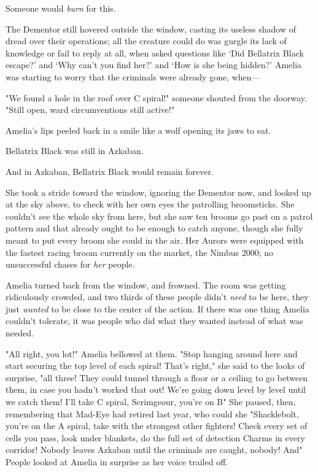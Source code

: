 Someone would \emph{burn} for this.

The Dementor still hovered outside the window, casting its useless shadow of
dread over their operations; all the creature could do was gurgle its lack of
knowledge or fail to reply at all, when asked questions like `Did Bellatrix
Black escape?' and `Why can't you find her?' and `How is she being hidden?'
Amelia was starting to worry that the criminals were already gone, when---

"We found a hole in the roof over C spiral!" someone shouted from the doorway.
"Still open, ward circumventions still active!"

Amelia's lips peeled back in a smile like a wolf opening its jaws to eat.

Bellatrix Black was still in Azkaban.

And in Azkaban, Bellatrix Black would remain forever.

She took a stride toward the window, ignoring the Dementor now, and looked up
at the sky above, to check with her own eyes the patrolling broomsticks. She
couldn't see the whole sky from here, but she saw ten brooms go past on a
patrol pattern and that already ought to be enough to catch anyone, though she
fully meant to put every broom she could in the air. Her Aurors were equipped
with the fastest racing broom currently on the market, the Nimbus 2000; no
unsuccessful chases for \emph{her} people.

Amelia turned back from the window, and frowned. The room was getting
ridiculously crowded, and two thirds of these people didn't \emph{need} to be
here, they just \emph{wanted} to be close to the center of the action. If there
was one thing Amelia couldn't tolerate, it was people who did what they wanted
instead of what was needed.

"All right, you lot!" Amelia bellowed at them. "Stop hanging around here and
start securing the top level of each spiral! That's right," she said to the
looks of surprise, "all three! They could tunnel through a floor or a ceiling
to go between them, in case you hadn't worked that out! We're going down level
by level until we catch them! I'll take C spiral, Scrimgeour, you're on
B{\el}" She paused, then, remembering that Mad-Eye had retired last year,
who could she{\el} "Shacklebolt, you're on the A spiral, take with the
strongest other fighters! Check every set of cells you pass, look under
blankets, do the full set of detection Charms in every corridor! Nobody leaves
Azkaban until the criminals are caught, nobody! And{\el}" People looked at
Amelia in surprise as her voice trailed off.

